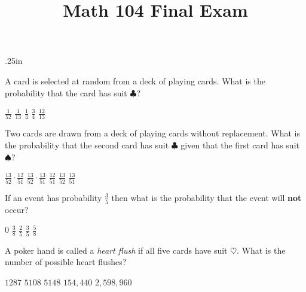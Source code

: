 \documentclass[answers,12pt]{exam}
\title{Math 104 Final Exam}
\date{}\author{}
\begin{document}
\maketitle
\begin{center}
\end{center}

\begin{questions}\itemsep.25in

\question A card is selected at random from a deck of
playing cards. What is the probability that
the card has suit $\clubsuit$?\\
\begin{oneparchoices}
\choice $\frac{1}{52}$
\choice $\frac{1}{13}$
\correctchoice $\frac{1}{4}$
\choice $\frac{3}{4}$
\choice $\frac{12}{13}$
\end{oneparchoices}

\question Two cards are drawn from a deck of playing cards
without replacement. What is the probability that
the second card has suit $\clubsuit$ given that the
first card has suit $\spadesuit$?\\
\begin{oneparchoices}
\choice $\frac{13}{52}\cdot\frac{12}{51}$
\choice $\frac{13}{52}\cdot\frac{13}{51}$
\choice $\frac{12}{51}$
\choice $\frac{13}{52}$
\correctchoice $\frac{13}{51}$
\end{oneparchoices}

\question If an event has probability $\frac{3}{5}$
then what is the probability that the event will {\bf not} occur?\\
\begin{oneparchoices}
\choice $0$
\choice $\frac{3}{8}$
\correctchoice $\frac{2}{5}$
\choice $\frac{3}{5}$
\choice $\frac{5}{8}$
\end{oneparchoices}

\question A poker hand is called a {\em heart flush}
if all five cards have suit $\heartsuit$. What is
the number of possible heart flushes?\\
\begin{oneparchoices}
\correctchoice $1287$
\choice $5108$ %
\choice $5148$ %
\choice $154,440$ %
\choice $2,598,960$ %
\end{oneparchoices}


\end{questions}
\end{document}
